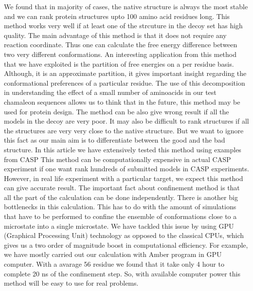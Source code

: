 \documentclass[12pt]{article}
\begin{document}
We found that in majority of cases, the native structure is always the most stable and we can rank
protein structures upto 100 amino 
acid residues long. This method works very well if at least one of the strcuture in the decoy set
has high quality. The main advantage of this method is 
that it does not require any reaction coordinate. Thus one can calculate the free energy difference between two very different conformations. 
An interesting application from this method that we have exploited is the partition of free energies
on a per residue basis.
 Although, it is an approximate partition, it gives important insight regarding the conformational 
preferences of a particular residue. The use of this decomposition in understanding the effect of a
small number of aminoacids in our test chamaleon sequences allows us to think that in the future,
this method may be used for protein design. 
The method can be also give wrong result if all the models in the decoy are very poor. It may also be difficult to rank structures if 
all the structures are very very close to the native structure. But we want to ignore this fact as our main aim is to differentiate
between the good and the bad structure. In this article we have extensively tested this method using examples from CASP 
This method can be computationally expensive in actual CASP experiment if one want rank hundreds of submitted models in CASP 
experiments. However, in real life experiment with a particular target, we expect this method can give accurate result. The important 
fact about confinement method is that all the part of the calculation can be done independently. 
There is another big bottlenecks in this calculation. This has to do with the amount of
simulations that have to be performed to confine the ensemble of conformations close to a microstate
into a single microstate. We have tackled this issue by using GPU (Graphical Processing Unit) technology as opposed to the classical
CPUs, which gives us a two order of magnitude boost in computational efficiency.
For example, we have mostly carried out our calculation with Amber program \cite{Case2005} in GPU computer. With a avarage 56 residue 
we found that it take only 4 hour to complete 20 ns of the confinement step. So, with available computer power this method will 
be easy to use for real problems. 
 
\end{document}
